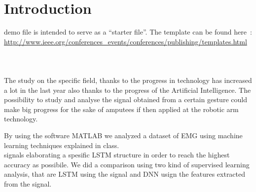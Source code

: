 \documentclass[journal]{IEEEtran}
\begin{document}
\section{Introduction}
% 
% 
% 
% 
 demo file is intended to serve as a ``starter file''.
The template can be found here~\cite{IEEEexample:IEEEtemplate}:\\ \url{http://www.ieee.org/conferences_events/conferences/publishing/templates.html }\\
\\
\\
\\
The study on the specific field, thanks to the progress in technology has increased a lot in the last year also thanks to the progress of the Artificial Intelligence. The possibility to study and analyse the signal obtained from a certain gesture could make big progress for the sake of amputees if then applied at the robotic arm technology.


By using the software MATLAB we analyzed a dataset of EMG using machine learning techniques explained in class. 
\\
signals elaborating a spesific LSTM structure in order to reach the highest accuracy as possibile. 
We did a comparison using two kind of supervised learning analysis, that are LSTM using the signal and DNN usign the features extracted from the signal.
\end{document}
